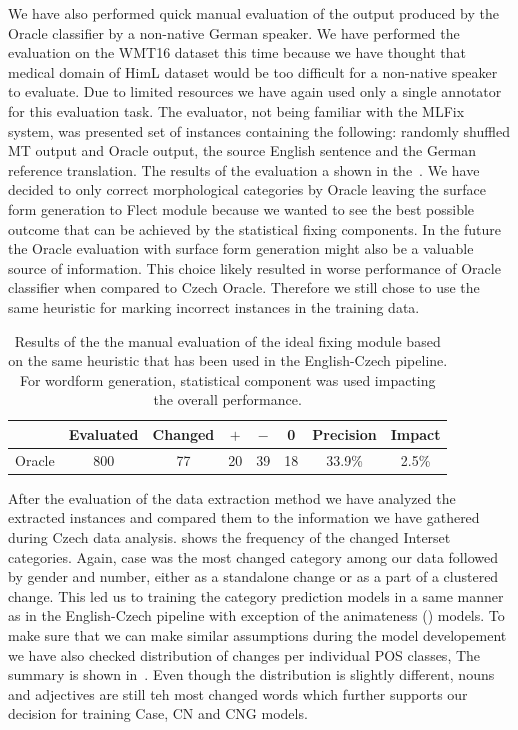 We have also performed quick manual evaluation of the output produced by the Oracle classifier by a non-native
German speaker.
We have performed the evaluation on the WMT16 dataset this time because we have thought that medical domain of HimL dataset
would be too difficult for a non-native speaker to evaluate.
Due to limited
resources we have again used only a single annotator for this evaluation task. The evaluator, not being familiar
with the MLFix system, was presented set of instances containing the following: randomly shuffled MT output and Oracle output,
the source English sentence and the German reference translation. The results of the evaluation a shown in the~.
We have decided to only correct morphological categories by Oracle leaving the surface form generation to Flect module because
we wanted to see the best possible outcome that can be achieved by the statistical fixing components. In the future
the Oracle evaluation with  surface form generation might also be a valuable source of information.
This choice likely resulted in worse performance of Oracle classifier when compared to Czech Oracle. Therefore
we still chose to use the same heuristic for marking incorrect instances in the training data.

\begin{table}[t]
\centering
\small

\begin{tabular}{l|cc|ccc|cc}
  &  Evaluated  &  Changed  &  $+$  &  $-$  &  0  &  Precision  &  Impact  \\
\hline
Oracle  &  800  &  77  &  20  &  39  &  18  &  33.9\%  &  2.5\%  \\
\end{tabular}
\caption{
Results of the the manual evaluation of the ideal fixing module based on the same heuristic
that has been used in the English-Czech pipeline. For wordform generation, statistical component
was used impacting the overall performance.
}
\label{oracle_de-maneval}
\end{table}

After the evaluation of the data extraction method we have analyzed the extracted instances and compared them
to the information we have gathered during Czech data analysis.  shows the frequency of the changed Interset
categories. Again, case was the most changed category among our data followed by gender and number, either as a standalone change or
as a part of a clustered change. This led us to training the category prediction models in a same manner as in the English-Czech
pipeline with exception of the animateness () models. To make sure that we can make similar assumptions during
the model developement we have also checked distribution of changes per individual POS classes, The summary is shown in~.
Even though the distribution is slightly different, nouns and adjectives are still teh most changed words which further supports
our decision for training Case, CN and CNG models.

